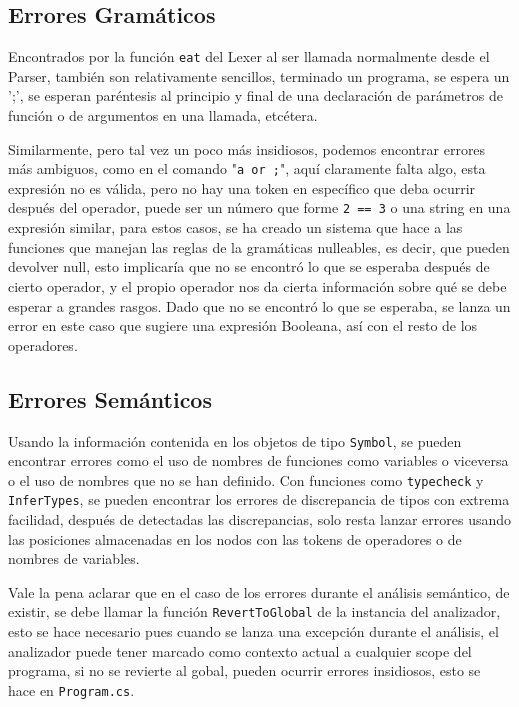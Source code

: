 \documentclass{article}
\begin{document}
\subsection{Errores Gramáticos}
Encontrados por la función \texttt{eat} del Lexer al ser llamada normalmente desde el Parser, también son relativamente sencillos, terminado un programa, se espera un ';', se esperan paréntesis al principio y final de una declaración de parámetros de función o de argumentos en una llamada, etcétera.

Similarmente, pero tal vez un poco más insidiosos, podemos encontrar errores más ambiguos, como en el comando "\texttt{a or ;}", aquí claramente falta algo, esta expresión no es válida, pero no hay una token en específico que deba ocurrir después del operador, puede ser un número que forme \texttt{2 == 3} o una string en una expresión similar, para estos casos, se ha creado un sistema que hace a las funciones que manejan las reglas de la gramáticas nulleables, es decir, que pueden devolver null, esto implicaría que no se encontró lo que se esperaba después de cierto operador, y el propio operador nos da cierta información sobre qué se debe esperar a grandes rasgos. Dado que no se encontró lo que se esperaba, se lanza un error en este caso que sugiere una expresión Booleana, así con el resto de los operadores.

\subsection{Errores Semánticos}
Usando la información contenida en los objetos de tipo \texttt{Symbol}, se pueden encontrar errores como el uso de nombres de funciones como variables o viceversa o el uso de nombres que no se han definido. Con funciones como \texttt{typecheck} y \texttt{InferTypes}, se pueden encontrar los errores de discrepancia de tipos con extrema facilidad, después de detectadas las discrepancias, solo resta lanzar errores usando las posiciones almacenadas en los nodos con las tokens de operadores o de nombres de variables.

Vale la pena aclarar que en el caso de los errores durante el análisis semántico, de existir, se debe llamar la función \texttt{RevertToGlobal} de la instancia del analizador, esto se hace necesario pues cuando se lanza una excepción durante el análisis, el analizador puede tener marcado como contexto actual a cualquier scope del programa, si no se revierte al gobal, pueden ocurrir errores insidiosos, esto se hace en \texttt{Program.cs}.
\end{document}

